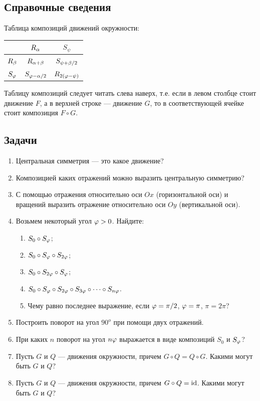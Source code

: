 \subsection*{Справочные сведения}

Таблица композиций движений окружности:
\begin{center}
\begin{tabular}{c|c|c|}
  & $R_\alpha$ & $S_\psi$ \\
 \hline
$R_\beta$ & $R_{\alpha+\beta}$ & $S_{\psi+\beta/2}$ \\
 \hline
$S_\varphi$ & $S_{\varphi-\alpha/2}$ & $R_{2(\varphi-\psi)}$ \\
\hline
\end{tabular}
\end{center}

Таблицу композиций следует читать слева наверх, т.е. если в левом столбце стоит движение $F$, а в верхней строке --- движение $G$, то в соответствующей ячейке стоит композиция $F\circ G$.

\subsection*{Задачи}
\begin{enumerate}
\item Центральная симметрия --- это какое движение?
\item Композицией каких отражений можно выразить центральную симметрию?
\item С помощью отражения относительно оси $Ox$ (горизонтальной оси) и вращений выразить отражение относительно оси $Oy$ (вертикальной оси).
\item Возьмем некоторый угол $\varphi>0$. Найдите:
\begin{enumerate}
\item $S_0\circ S_\varphi$;
\item $S_0\circ S_\varphi\circ S_{2\varphi}$;
\item $S_0\circ S_{2\varphi}\circ S_{\varphi}$;
\item $\displaystyle S_0\circ S_\varphi\circ S_{2\varphi}\circ S_{3\varphi}\circ\dots\circ S_{n\varphi}$.
\item Чему равно последнее выражение, если $\varphi=\pi/2$, $\varphi=\pi$, $\pi=2\pi$?
\end{enumerate}
\item Построить поворот на угол $90^o$ при помощи двух отражений.
\item При каких $n$ поворот на угол $n\varphi$ выражается в виде композиций $S_0$ и $S_\varphi$?
\item Пусть $G$ и $Q$ --- движения окружности, причем $G\circ Q=Q\circ G$. Какими могут быть $G$ и $Q$?
\item Пусть $G$ и $Q$ --- движения окружности, причем $G\circ Q=\mathrm{id}$. Какими могут быть $G$ и $Q$?
\end{enumerate}







